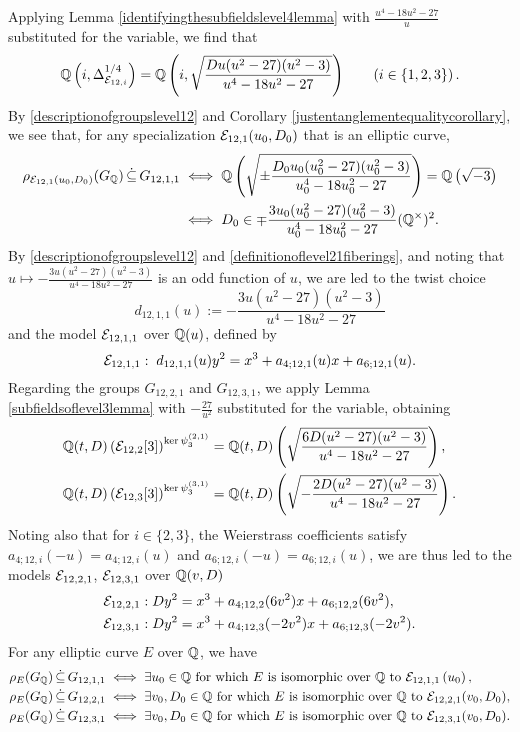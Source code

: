 Applying Lemma \ref{identifyingthesubfieldslevel4lemma} with $\frac{u^4 - 18u^2 - 27}{u}$ substituted for the variable, we find that
\[
\mathbb{Q}\left( i, \Delta_{\mathcal{E}_{12,i}}^{1/4} \right) = \mathbb{Q}\left( i, \sqrt{\frac{Du(u^2-27)(u^2-3)}{u^4-18u^2-27}} \right) \quad\quad \left( i \in \{1, 2, 3 \} \right).
\]
By \eqref{descriptionofgroupslevel12} and Corollary \ref{justentanglementequalitycorollary}, we see that, for any specialization $\mathcal{E}_{12,1}(u_0,D_0)$ that is an elliptic curve,
\[
\begin{split}
\rho_{\mathcal{E}_{12,1}(u_0,D_0)}(G_{\mathbb{Q}}) \, \dot\subseteq \, G_{12,1,1} \; &\Longleftrightarrow \; \mathbb{Q}\left( \sqrt{\pm \frac{D_0u_0(u_0^2-27)(u_0^2-3)}{u_0^4-18u_0^2-27}} \right) = \mathbb{Q}\left( \sqrt{-3} \right) \\
&\Longleftrightarrow \; D_0 \in \mp \frac{3u_0(u_0^2-27)(u_0^2-3)}{u_0^4-18u_0^2-27} (\mathbb{Q}^\times)^2.
\end{split}
\]
By \eqref{descriptionofgroupslevel12} and \eqref{definitionoflevel21fiberings}, and noting that $u \mapsto -\frac{3u(u^2-27)(u^2-3)}{u^4-18u^2-27}$ is an odd function of $u$, we are led to the twist choice
\[
d_{12,1,1}(u) := -\frac{3u(u^2-27)(u^2-3)}{u^4-18u^2-27}
\]
and the model $\mathcal{E}_{12,1,1}$ over $\mathbb{Q}(u)$, defined by
\[
\mathcal{E}_{12,1,1} : \; d_{12,1,1}(u) y^2 = x^3 + a_{4;12,1}(u) x + a_{6;12,1}(u).
\]
Regarding the groups $G_{12,2,1}$ and $G_{12,3,1}$, we apply Lemma \ref{subfieldsoflevel3lemma} with $-\frac{27}{u^2}$ substituted for the variable, obtaining
\[
\begin{split}
\mathbb{Q}(t,D) \left( \mathcal{E}_{12,2}[3] \right)^{\ker \psi_3^{(2,1)}} &= \mathbb{Q}(t,D) \left( \sqrt{\frac{6D(u^2-27)(u^2-3)}{u^4-18u^2-27}} \right), \\
\mathbb{Q}(t,D) \left( \mathcal{E}_{12,3}[3] \right)^{\ker \psi_3^{(3,1)}} &= \mathbb{Q}(t,D) \left( \sqrt{-\frac{2D(u^2-27)(u^2-3)}{u^4-18u^2-27}} \right).
\end{split}
\] 
Noting also that for $i \in \{2, 3 \}$, the Weierstrass coefficients satisfy $a_{4;12,i}(-u) = a_{4;12,i}(u)$ and $a_{6;12,i}(-u) = a_{6;12,i}(u)$, we are thus led to the models $\mathcal{E}_{12,2,1}$, $\mathcal{E}_{12,3,1}$ over $\mathbb{Q}(v,D)$
\[
\begin{split}
\mathcal{E}_{12,2,1} : \; &D y^2 = x^3 + a_{4;12,2}(6v^2) x + a_{6;12,2}(6v^2), \\
\mathcal{E}_{12,3,1} : \; &D y^2 = x^3 + a_{4;12,3}(-2v^2) x + a_{6;12,3}(-2v^2).
\end{split}
\] 
For any elliptic curve $E$ over $\mathbb{Q}$, we have
\[
\begin{split}
\rho_{E}(G_{\mathbb{Q}}) \, \dot\subseteq \, G_{12,1,1} \; &\Longleftrightarrow \; \exists u_0 \in \mathbb{Q} \text{ for which } E \text{ is isomorphic over $\mathbb{Q}$ to } \mathcal{E}_{12,1,1}\left( u_0 \right), \\
\rho_{E}(G_{\mathbb{Q}}) \, \dot\subseteq \, G_{12,2,1} \; &\Longleftrightarrow \; \exists v_0, D_0 \in \mathbb{Q} \text{ for which } E \text{ is isomorphic over $\mathbb{Q}$ to } \mathcal{E}_{12,2,1}(v_0,D_0), \\
\rho_{E}(G_{\mathbb{Q}}) \, \dot\subseteq \, G_{12,3,1} \; &\Longleftrightarrow \; \exists v_0, D_0 \in \mathbb{Q} \text{ for which } E \text{ is isomorphic over $\mathbb{Q}$ to } \mathcal{E}_{12,3,1}(v_0,D_0).
\end{split}
\]
